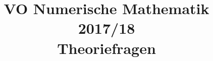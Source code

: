 \documentclass[10pt,a4paper]{article}
\begin{document}
	\title{VO Numerische Mathematik
		\\
		2017/18
		\\
		\flushbottom
		Theoriefragen }
	\maketitle
	
	\newpage
	
	\newpage
	
	\newpage
	
	\newpage
	
\end{document}
